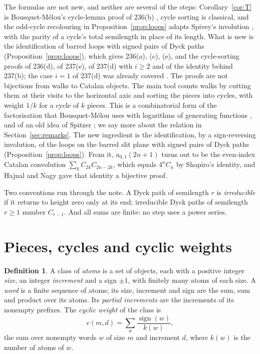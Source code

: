 \documentclass[11pt]{amsart}
\theoremstyle{definition}
\newtheorem{definition}[theorem]{Definition}
\theoremstyle{remark}
\begin{document}
The formulas are not new, and neither are several of the steps: Corollary~\ref{cor:T} is Bousquet-M\'elou's
cycle-lemma proof of 236(b) \cite[Prop.~2]{BM}, cycle sorting is classical, and the odd-cycle recolouring in
Proposition~\ref{prop:loops} adapts Spivey's involution \cite{Sp}, with the parity of a cycle's total semilength in
place of its length. What is new is the identification of barred loops with signed pairs of Dyck paths
(Proposition~\ref{prop:loops}), which gives 236(a), (c), (e), and the cycle-sorting proofs of 236(d), of 237(e), of
237(d) with $i\ge2$ and of the identity behind 237(b); the case $i=1$ of 237(d) was already covered \cite{BM,Nad}.
The proofs are not bijections from walks to Catalan objects. The main tool
counts walks by cutting them at their visits to the horizontal axis and sorting the pieces into cycles, with weight $1/k$
for a cycle of $k$ pieces. This is a combinatorial form of the factorisation that Bousquet-M\'elou uses with logarithms
of generating functions \cite[Props.~8, 9]{BM}, and of an old idea of Spitzer \cite{St}; we say more about the relation
in Section~\ref{sec:remarks}. The new ingredient is the identification, by a sign-reversing involution, of the loops
on the barred slit plane with signed pairs of Dyck paths (Proposition~\ref{prop:loops}). From it, $a_{0,1}(2n+1)$ turns
out to be the even-index Catalan convolution $\sum_kC_{2k}C_{2n-2k}$, which equals $4^nC_n$ by Shapiro's identity, and
Hajnal and Nagy \cite{HN} gave that identity a bijective proof.

Two conventions run through the note. A Dyck path of semilength $r$ is \emph{irreducible} if it returns to height zero
only at its end; irreducible Dyck paths of semilength $r\ge1$ number $C_{r-1}$. And all sums are finite: no step uses a
power series.

\section{Pieces, cycles and cyclic weights}\label{sec:cycles}

\begin{definition}
A class of \emph{atoms} is a set of objects, each with a positive integer \emph{size}, an integer \emph{increment} and
a sign $\pm1$, with finitely many atoms of each size. A \emph{word} is a finite sequence of atoms; its size, increment
and sign are the sum, sum and product over its atoms. Its \emph{partial increments} are the increments of its nonempty
prefixes. The \emph{cyclic weight} of the class is
\begin{equation}\label{eq:cw}
  c(m,d)=\sum_{w}\frac{\operatorname{sign}(w)}{k(w)},
\end{equation}
the sum over nonempty words $w$ of size $m$ and increment $d$, where $k(w)$ is the number of atoms of $w$.
\end{definition}
\end{document}
